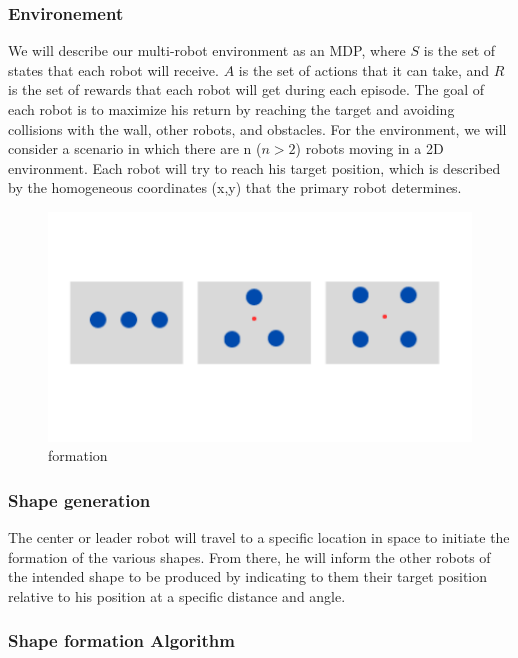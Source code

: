 \documentclass[12pt]{extarticle}
\begin{document}
\subsubsection{Environement}

We will describe our multi-robot environment as an MDP, where $S$ is the set of states that each robot will receive. $A$ is the set of actions that it can take, and $R$ is the set of rewards that each robot will get during each episode. The goal of each robot is to maximize his return by reaching the target and avoiding collisions with the wall, other robots, and obstacles.
For the environment, we will consider a scenario in which there are n ($n > 2$) robots moving in a 2D environment. Each robot will try to reach his target position, which is described by the homogeneous coordinates (x,y) that the primary robot determines.

 
 \begin{figure}[h]  
\centering
\includegraphics[scale=0.4]{formation}
\caption[formation]{formation}
\end{figure}

\pagebreak
\subsubsection{Shape generation}
The center or leader robot will travel to a specific location in space to initiate the formation of the various shapes. From there, he will inform the other robots of the intended shape to be produced by indicating to them their target position relative to his position at a specific distance and angle.


\subsubsection{Shape formation Algorithm}
\end{document}
